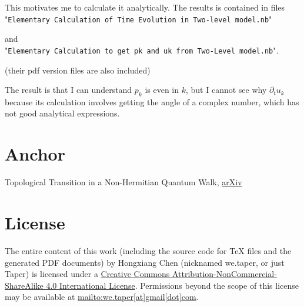 \documentclass{article}
\begin{document}
This motivates me to calculate it analytically. The results is
contained in files \\
"\texttt{Elementary Calculation of Time Evolution in Two-level model.nb}"

and\\
"\texttt{Elementary Calculation to get pk and uk from Two-Level
model.nb}".

(their pdf version files are also included) 

The result is that I can understand $p_k$ is even in $k$, but I cannot
see why $\partial_t u_k$ because its calculation involves getting the
angle of a complex number, which has not good analytical expressions.

\section{Anchor}
\label{sec:Anchor}

\begin{thebibliography}{1}
     Topological Transition in a Non-Hermitian Quantum
    Walk,
    \href{https://arxiv.org/ct?url=http%3A%2F%2Fdx.doi.org%2F10%252E1103%2FPhysRevLett%252E102%252E065703&v=f6968ad6}{arXiv}
\end{thebibliography}
\printnomenclature
\section{License}
The entire content of this work (including the source code
for TeX files and the generated PDF documents) by 
Hongxiang Chen (nicknamed we.taper, or just Taper) is
licensed under a 
\href{http://creativecommons.org/licenses/by-nc-sa/4.0/}{Creative 
Commons Attribution-NonCommercial-ShareAlike 4.0 International 
License}. Permissions beyond the scope of this 
license may be available at \url{mailto:we.taper[at]gmail[dot]com}.
\end{document}
